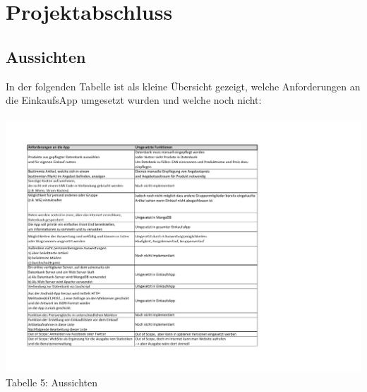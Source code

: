 \documentclass[12pt,a4paper]{article}
\begin{document}
\section{Projektabschluss}
\subsection{Aussichten}
In der folgenden Tabelle ist als kleine Übersicht gezeigt, welche Anforderungen an die EinkaufsApp umgesetzt wurden und welche noch nicht: 
\\
\\
\hspace*{-10mm} 
\includegraphics[trim = 17mm 10mm 0mm 20mm,clip,scale=0.9]{Anforderungen-Probleme.pdf}
\\
\footnotesize Tabelle 5: Aussichten
\normalsize
\end{document}
